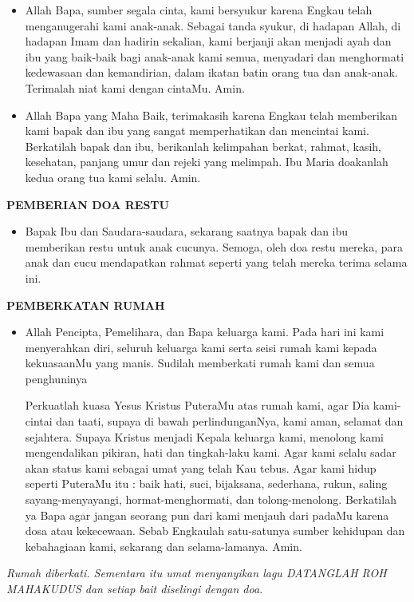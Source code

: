 \documentclass[12pt,twoside,anypage]{scrbook}
\makeatletter
\newcommand{\judul}[1]{%
  {\parindent \z@ \centering \normalfont
    \interlinepenalty\@M \large \bfseries #1\par\nobreak \vskip 20\p@ }}
\newcommand{\subjudul}[1]{%
  {\parindent \z@ \normalfont
    \interlinepenalty\@M \bfseries #1\par\nobreak \vskip 20\p@ }}
\newcommand{\BI}[1]{\begin{itemize} \item[I:] #1 \end{itemize}}
\newcommand{\Bgen}[2]{\begin{itemize} \item[#1:] #2 \end{itemize}}
\makeatother
\begin{document}
\Bgen{Pasutri}{Allah Bapa, sumber segala cinta, kami bersyukur karena Engkau telah menganugerahi kami anak-anak. Sebagai tanda syukur, di hadapan Allah, di hadapan Imam dan hadirin sekalian, kami berjanji akan menjadi ayah dan ibu yang baik-baik bagi anak-anak kami semua, menyadari dan menghormati kedewasaan dan kemandirian, dalam ikatan batin orang tua dan anak-anak. Terimalah niat kami dengan cintaMu.  Amin.}

\Bgen{Anak}{Allah Bapa yang Maha Baik, terimakasih karena Engkau telah memberikan kami bapak dan ibu yang sangat memperhatikan dan mencintai kami. Berkatilah bapak dan ibu, berikanlah kelimpahan berkat, rahmat, kasih, kesehatan, panjang umur dan rejeki yang melimpah. Ibu Maria doakanlah kedua orang tua kami selalu.	Amin.}

\subjudul{PEMBERIAN DOA RESTU}

\BI{Bapak Ibu dan Saudara-saudara, sekarang saatnya bapak dan ibu memberikan restu untuk anak cucunya. Semoga, oleh doa restu mereka, para anak dan cucu mendapatkan rahmat seperti yang telah mereka terima selama ini.}


\judul{PEMBERKATAN RUMAH}

\BI{Allah Pencipta, Pemelihara, dan Bapa keluarga kami. Pada hari ini kami menyerahkan diri, seluruh keluarga kami serta seisi rumah kami kepada kekuasaanMu yang manis. Sudilah memberkati rumah kami dan semua penghuninya \Cross \xspace 

Perkuatlah kuasa Yesus Kristus PuteraMu atas rumah kami, agar Dia kami-cintai dan taati, supaya di bawah perlindunganNya, kami aman, selamat dan sejahtera. Supaya Kristus menjadi Kepala keluarga kami, menolong kami mengendalikan pikiran, hati dan tingkah-laku kami. Agar kami selalu sadar akan status kami sebagai umat yang telah Kau tebus. Agar kami hidup seperti PuteraMu itu : baik hati, suci, bijaksana, sederhana, rukun, saling sayang-menyayangi, hormat-menghormati, dan tolong-menolong. Berkatilah ya Bapa agar jangan seorang pun dari kami menjauh dari padaMu karena dosa atau kekecewaan. Sebab Engkaulah satu-satunya sumber kehidupan dan kebahagiaan kami, sekarang dan selama-lamanya.
Amin.}


{\itshape Rumah diberkati. Sementara itu umat menyanyikan lagu \emph{DATANGLAH ROH MAHAKUDUS} dan setiap bait diselingi dengan doa.}
\end{document}
